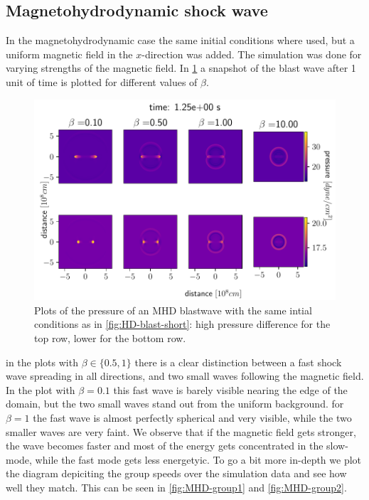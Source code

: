 \subsection{Magnetohydrodynamic shock wave}
In the magnetohydrodynamic case the same initial conditions where used, but a uniform magnetic field in the $x$-direction was added. The simulation was done for varying strengths of the magnetic field.
In \cref{fig:MHD-blasts} a snapshot of the blast wave after 1 unit of time is plotted for different values of $\beta$.

\begin{figure}[H]
	\centering
	\includegraphics[width=\linewidth]{images/MHD-blasts.pdf}
	\caption{Plots of the pressure of an MHD blastwave with the same intial conditions as in \cref{fig:HD-blast-short}: high pressure difference for the top row, lower for the bottom row.}
	\label{fig:MHD-blasts}
\end{figure}
in the plots with $\beta \in \{0.5,1\}$ there is a clear distinction between a fast shock wave spreading in all directions, and two small waves following the magnetic field.
In the plot with $\beta=0.1$ this fast wave is barely visible nearing the edge of the domain, but the two small waves stand out from the uniform background.
for $\beta=1$ the fast wave is almost perfectly spherical and very visible, while the two smaller waves are very faint.
We observe that if the magnetic field gets stronger, the wave becomes faster and most of the energy gets concentrated in the slow-mode, while the fast mode gets less energetyic. 
To go a bit more in-depth we plot the diagram depiciting the group speeds over the simulation data and see how well they match. 
This can be seen in \cref{fig:MHD-group1} and \cref{fig:MHD-group2}.

